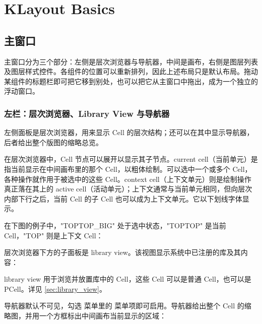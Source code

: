 \chapter{KLayout Basics}\label{ch:basic}

\section{主窗口}\label{sec:main_window}

主窗口分为三个部分：左侧是层次浏览器与导航器，中间是画布，右侧是图层列表及图层样式控件。各组件的位置可以重新排列，因此上述布局只是默认布局。拖动某组件的标题栏即可把它移到别处，也可以把它从主窗口中拖出，成为一个独立的浮动窗口。


\subsection{左栏：层次浏览器、Library View 与导航器}

左侧面板是层次浏览器，用来显示 Cell 的层次结构；还可以在其中显示导航器，后者给出整个版图的缩略总览。

在层次浏览器中，Cell 节点可以展开以显示其子节点。current cell（当前单元）是指当前显示在中间画布里的那个 Cell，以粗体绘制。可以选中一个或多个 Cell，各种操作就作用于被选中的这些 Cell。context cell（上下文单元）则是绘制操作真正落在其上的 active cell（活动单元）；上下文通常与当前单元相同，但向层次内部下行之后，当前 Cell 的子 Cell 也可以成为上下文单元。它以下划线字体显示。

在下图的例子中，"TOPTOP\_BIG" 处于选中状态，"TOPTOP" 是当前 Cell，"TOP" 则是上下文 Cell：


层次浏览器下方的子面板是 library view。该视图显示系统中已注册的库及其内容：


library view 用于浏览并放置库中的 Cell，这些 Cell 可以是普通 Cell，也可以是 PCell。详见 \ref{sec:library_view}。

导航器默认不可见，勾选  菜单里的  菜单项即可启用。导航器给出整个 Cell 的缩略图，并用一个方框标出中间画布当前显示的区域：


